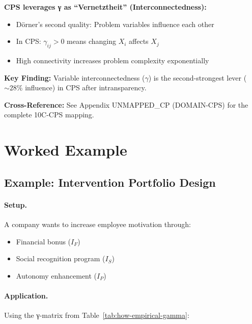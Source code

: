 \begin{tcolorbox}[colback=green!5!white, colframe=green!75!black,
    title=Application Domain: Complex Problem Solving (CP)]
\textbf{CPS leverages γ as ``Vernetztheit'' (Interconnectedness):}
\begin{itemize}[nosep]
\item Dörner's second quality: Problem variables influence each other
\item In CPS: $\gamma_{ij} > 0$ means changing $X_i$ affects $X_j$
\item High connectivity increases problem complexity exponentially
\end{itemize}

\textbf{Key Finding:} Variable interconnectedness ($\gamma$) is the second-strongest lever ($\sim 28\%$ influence) in CPS after intransparency.

\textbf{Cross-Reference:} See Appendix UNMAPPED_CP (DOMAIN-CPS) for the complete 10C-CPS mapping.
\end{tcolorbox}


\section{Worked Example}
\label{sec:how-example}

\subsection{Example: Intervention Portfolio Design}

\paragraph{Setup.}
A company wants to increase employee motivation through:
\begin{itemize}
\item Financial bonus ($I_F$)
\item Social recognition program ($I_S$)
\item Autonomy enhancement ($I_P$)
\end{itemize}

\paragraph{Application.}
Using the γ-matrix from Table~\ref{tab:how-empirical-gamma}:


